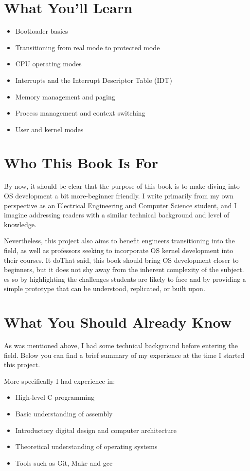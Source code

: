 \section{What You'll Learn}

\begin{itemize}
  \item Bootloader basics
  \item Transitioning from real mode to protected mode
  \item CPU operating modes
  \item Interrupts and the Interrupt Descriptor Table (IDT)
  \item Memory management and paging
  \item Process management and context switching
  \item User and kernel modes
\end{itemize}

\section{Who This Book Is For}

By now, it should be clear that the purpose of this book is to make diving into OS development a bit more-beginner friendly.
I write primarily from my own perspective as an Electrical Engineering and Computer Science student, and I imagine addressing 
readers with a similar technical background and level of knowledge.

Nevertheless, this project also aims to benefit engineers transitioning into the field, as well as professors seeking to 
incorporate OS kernel development into their courses. It doThat said, this book should bring OS development closer to beginners, but it does not shy away from the 
inherent complexity of the subject.
es so by highlighting the challenges students are likely to face 
and by providing a simple prototype that can be understood, replicated, or built upon.

\section{What You Should Already Know}

As was mentioned above, I had some technical background before entering the field.
Below you can find a brief summary of my experience at the time I started this project.

More specifically I had experience in:
\begin{itemize}
    \item High-level C programming
    \item Basic understanding of assembly
    \item Introductory digital design and computer architecture
    \item Theoretical understanding of operating systems
    \item Tools such as Git, Make and gcc
  \end{itemize}


